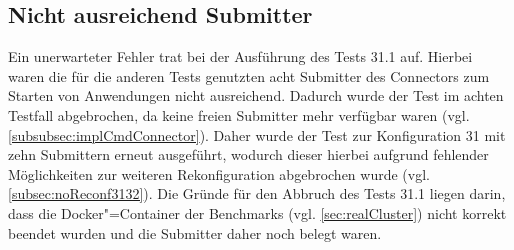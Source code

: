 \subsection{Nicht ausreichend Submitter}
\label{subsec:notEnoughSubmitter}

Ein unerwarteter Fehler trat bei der Ausführung des Tests 31.1 auf.
Hierbei waren die für die anderen Tests genutzten acht Submitter des Connectors zum Starten von Anwendungen nicht ausreichend.
Dadurch wurde der Test im achten Testfall abgebrochen, da keine freien Submitter mehr verfügbar waren (vgl. \cref{subsubsec:implCmdConnector}).
Daher wurde der Test zur Konfiguration 31 mit zehn Submittern erneut ausgeführt, wodurch dieser hierbei aufgrund fehlender Möglichkeiten zur weiteren Rekonfiguration abgebrochen wurde (vgl. \cref{subsec:noReconf3132}).
Die Gründe für den Abbruch des Tests 31.1 liegen darin, dass die Docker"=Container der Benchmarks (vgl. \cref{sec:realCluster}) nicht korrekt beendet wurden und die Submitter daher noch belegt waren.
